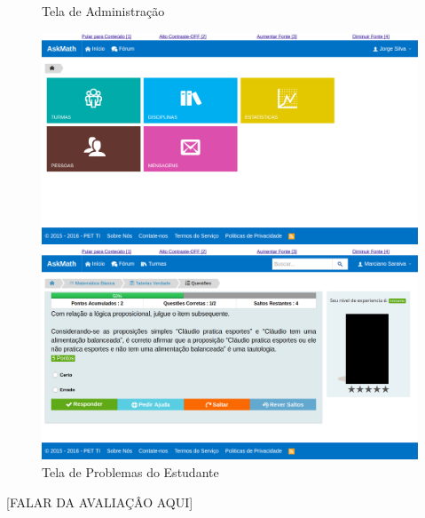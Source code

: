 \begin{figure}[h!]
  \begin{minipage}[b]{0.49\textwidth}
    \caption{Tela de Administra\c{c}\~ao}
    \includegraphics[width=\textwidth]{figuras/askmath/3}
  \end{minipage}
  \hfill
  \begin{minipage}[b]{0.49\textwidth}
	\caption{Tela de Problemas do Estudante}
    \includegraphics[width=\textwidth]{figuras/askmath/4}
  \end{minipage}
\end{figure}

[FALAR DA AVALIAÇÂO AQUI]
